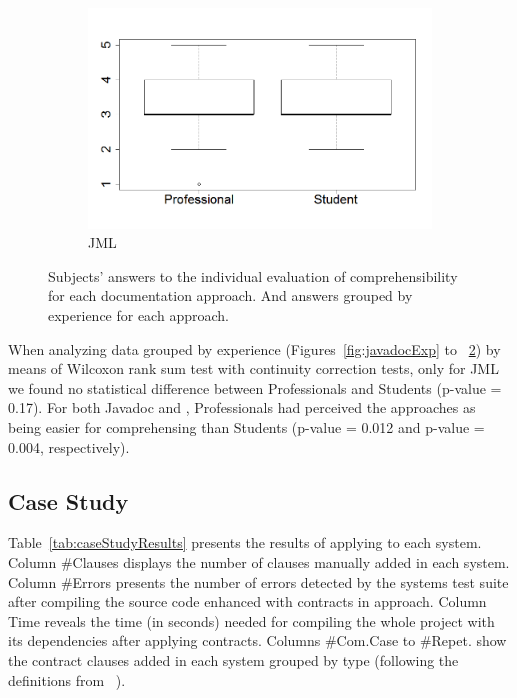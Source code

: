 \begin{figure}
\begin{subfigure}{.48\textwidth}
\caption{\contractjdoc{}}
\label{fig:contractjdocExp}
\end{subfigure}
\begin{subfigure}{.48\textwidth}
\includegraphics[width=1\linewidth]{figs/boxplotJMLXExperience.png}
\caption{JML}
\label{fig:jmlExp}
\end{subfigure}
\caption{Subjects' answers to the individual evaluation of comprehensibility for
each documentation approach. And answers grouped by experience for each
approach.}
\label{fig:surveyResults}
\end{figure}

When analyzing data grouped by experience (Figures~\ref{fig:javadocExp} to
~\ref{fig:jmlExp}) by means of Wilcoxon rank sum test with continuity correction
tests, only for JML we found no statistical difference between Professionals and
Students (p-value = 0.17). For both Javadoc and \contractjdoc{}, Professionals
had perceived the approaches as being easier for comprehensing than Students
(p-value = 0.012 and p-value = 0.004, respectively).




\subsection{Case Study}

Table~\ref{tab:caseStudyResults} presents the results of applying \contractjdoc{} to each system.
Column \#Clauses displays the number of clauses manually added in each system.
Column \#Errors presents the number of errors detected by the systems test suite after compiling the source code enhanced with contracts in
\contractjdoc{} approach. Column Time reveals the time (in seconds) needed for compiling the whole
project with its dependencies after applying \contractjdoc{} contracts. Columns \#Com.Case to \#Repet.
show the contract clauses added in each system grouped by type (following the
definitions from ~\cite{typeContracts}).


